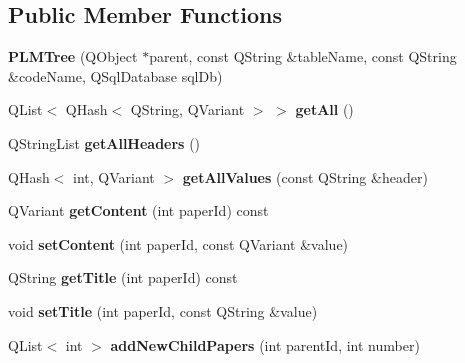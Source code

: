 \subsection*{Public Member Functions}
\begin{DoxyCompactItemize}
\item 
{\bfseries P\+L\+M\+Tree} (Q\+Object $\ast$parent, const Q\+String \&table\+Name, const Q\+String \&code\+Name, Q\+Sql\+Database sql\+Db)\hypertarget{class_p_l_m_tree_a27464361b0cb61431985f7f2d24fe627}{}\label{class_p_l_m_tree_a27464361b0cb61431985f7f2d24fe627}

\item 
Q\+List$<$ Q\+Hash$<$ Q\+String, Q\+Variant $>$ $>$ {\bfseries get\+All} ()\hypertarget{class_p_l_m_tree_a7d73d7331476825a8c21d6f93cb30dd7}{}\label{class_p_l_m_tree_a7d73d7331476825a8c21d6f93cb30dd7}

\item 
Q\+String\+List {\bfseries get\+All\+Headers} ()\hypertarget{class_p_l_m_tree_acc38394cc2001c3a98d364f2a8557568}{}\label{class_p_l_m_tree_acc38394cc2001c3a98d364f2a8557568}

\item 
Q\+Hash$<$ int, Q\+Variant $>$ {\bfseries get\+All\+Values} (const Q\+String \&header)\hypertarget{class_p_l_m_tree_a3d599533c1ff07ec6dfa0934eefba514}{}\label{class_p_l_m_tree_a3d599533c1ff07ec6dfa0934eefba514}

\item 
Q\+Variant {\bfseries get\+Content} (int paper\+Id) const \hypertarget{class_p_l_m_tree_a88e71f3eec07a041302f808cc86c413a}{}\label{class_p_l_m_tree_a88e71f3eec07a041302f808cc86c413a}

\item 
void {\bfseries set\+Content} (int paper\+Id, const Q\+Variant \&value)\hypertarget{class_p_l_m_tree_a806c2ed32ff05a28adf428278511b982}{}\label{class_p_l_m_tree_a806c2ed32ff05a28adf428278511b982}

\item 
Q\+String {\bfseries get\+Title} (int paper\+Id) const \hypertarget{class_p_l_m_tree_a428aabb32040c2296f172fc38b54b3cd}{}\label{class_p_l_m_tree_a428aabb32040c2296f172fc38b54b3cd}

\item 
void {\bfseries set\+Title} (int paper\+Id, const Q\+String \&value)\hypertarget{class_p_l_m_tree_a969316b62ad9871e09f1985c27af2a14}{}\label{class_p_l_m_tree_a969316b62ad9871e09f1985c27af2a14}

\item 
Q\+List$<$ int $>$ {\bfseries add\+New\+Child\+Papers} (int parent\+Id, int number)\hypertarget{class_p_l_m_tree_ae749d577145f9155fac7659a6c532940}{}\label{class_p_l_m_tree_ae749d577145f9155fac7659a6c532940}


\end{DoxyCompactItemize}
